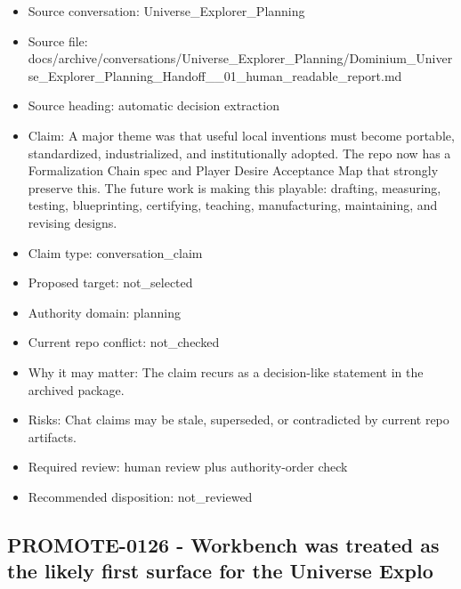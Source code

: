 \documentclass[11pt,a4paper]{report}
\begin{document}
\begin{itemize}
\item Source conversation: Universe\_Explorer\_Planning
\item Source file: docs/archive/conversations/Universe\_Explorer\_Planning/Dominium\_Universe\_Explorer\_Planning\_Handoff\_\_01\_human\_readable\_report.md
\item Source heading: automatic decision extraction
\item Claim: A major theme was that useful local inventions must become portable, standardized, industrialized, and institutionally adopted. The repo now has a Formalization Chain spec and Player Desire Acceptance Map that strongly preserve this. The future work is making this playable: drafting, measuring, testing, blueprinting, certifying, teaching, manufacturing, maintaining, and revising designs.
\item Claim type: conversation\_claim
\item Proposed target: not\_selected
\item Authority domain: planning
\item Current repo conflict: not\_checked
\item Why it may matter: The claim recurs as a decision-like statement in the archived package.
\item Risks: Chat claims may be stale, superseded, or contradicted by current repo artifacts.
\item Required review: human review plus authority-order check
\item Recommended disposition: not\_reviewed
\end{itemize}

\subsection{PROMOTE-0126 - Workbench was treated as the likely first surface for the Universe Explo}
\end{document}
